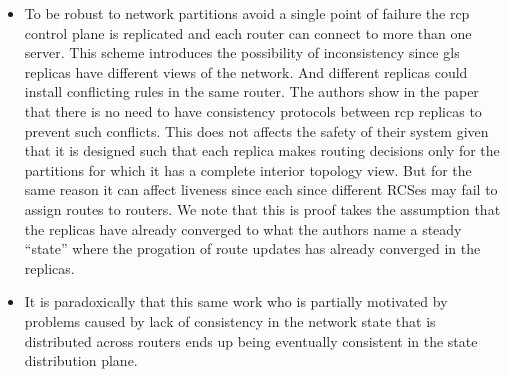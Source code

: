 \documentclass[12pt,openright,twoside]{report}
\begin{document}
\begin{itemize}
\item To be robust to network partitions avoid a single point of failure the \gls{rcp} control plane is replicated and each router can connect to more than one server. 
This scheme introduces the possibility of inconsistency since  \gls{gls} replicas have different views of the network. 
And different replicas could install conflicting rules in the same router. 
The authors show in the paper that there is no need to have consistency protocols between \gls{rcp} replicas to prevent such conflicts. 
This does not affects the safety of their system given that it is designed such that each replica makes routing decisions only for the partitions for which it has a complete interior topology view. But for the same reason it can affect liveness since each since different RCSes may fail to assign routes to routers. 
We note that this is proof takes the assumption that the replicas have already converged to what the authors name a steady ``state''  where the progation of route updates has already converged in the \gls{replicas}. 


\item It is paradoxically that this same work who is partially motivated by problems caused by lack of consistency in the network state that is distributed across routers ends up being eventually consistent in the state distribution plane. 
\end{itemize}
\end{document}
